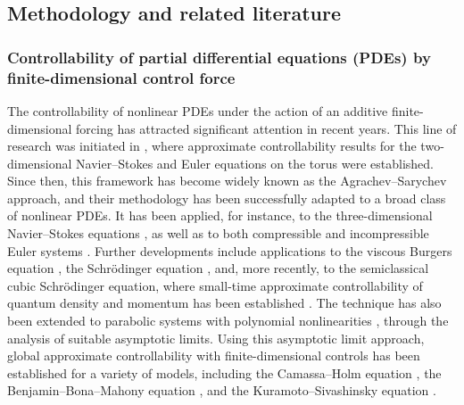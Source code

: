 \documentclass[10pt, reqno]{amsart}
\numberwithin{equation}{section}
\begin{document}
\subsection{Methodology and related literature}
\subsubsection{Controllability of partial differential equations (PDEs) by finite-dimensional control force} The controllability of nonlinear PDEs under the action of an additive finite-dimensional forcing has attracted significant attention in recent years. This line of research was initiated in \cite{Agrachev_2005, Agrachev_2006}, where approximate controllability results for the two-dimensional Navier–Stokes and Euler equations on the torus were established. Since then, this framework has become widely known as the Agrachev–Sarychev approach, and their methodology has been successfully adapted to a broad class of nonlinear PDEs. It has been applied, for instance, to the three-dimensional Navier–Stokes equations \cite{Shirikyan_06, Shirikyan_07}, as well as to both compressible and incompressible Euler systems \cite{Nersisyan_2010, Nersisyan_2011}. Further developments include applications to the viscous Burgers equation \cite{Shirikyan_14, Shirikyan_18}, the Schrödinger equation \cite{Sarychev_12}, and, more recently, to the semiclassical cubic Schrödinger equation, where small-time approximate controllability of quantum density and momentum has been established \cite{Coron_Xiang_Zhang_2023}. The technique has also been extended to parabolic systems with polynomial nonlinearities \cite{Narsesyan_21}, through the analysis of suitable asymptotic limits. Using this asymptotic limit approach, global approximate controllability with finite-dimensional controls has been established for a variety of models, including the Camassa–Holm equation \cite{Chowdhury_Dutta_Mondal_25}, the Benjamin–Bona–Mahony equation \cite{Jellouli_23}, and the Kuramoto–Sivashinsky equation \cite{Peng_Gao_2022}.
\end{document}
